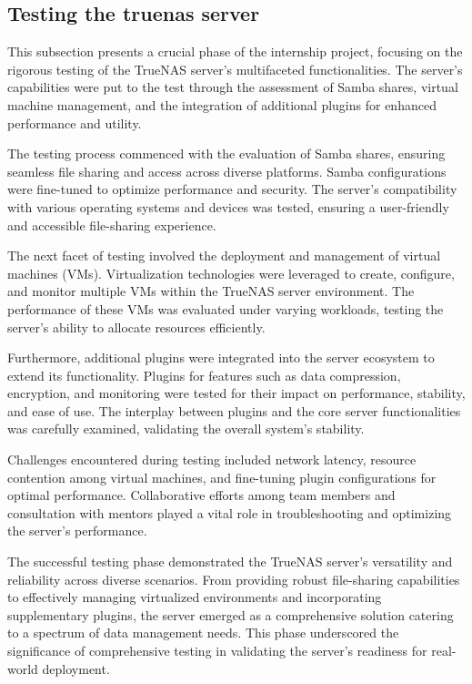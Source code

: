\subsection{Testing the truenas server}
This subsection presents a crucial phase of the internship project, focusing on the rigorous testing of the TrueNAS server's multifaceted functionalities. The server's capabilities were put to the test through the assessment of Samba shares, virtual machine management, and the integration of additional plugins for enhanced performance and utility.

The testing process commenced with the evaluation of Samba shares, ensuring seamless file sharing and access across diverse platforms. Samba configurations were fine-tuned to optimize performance and security. The server's compatibility with various operating systems and devices was tested, ensuring a user-friendly and accessible file-sharing experience.

The next facet of testing involved the deployment and management of virtual machines (VMs). Virtualization technologies were leveraged to create, configure, and monitor multiple VMs within the TrueNAS server environment. The performance of these VMs was evaluated under varying workloads, testing the server's ability to allocate resources efficiently.

Furthermore, additional plugins were integrated into the server ecosystem to extend its functionality. Plugins for features such as data compression, encryption, and monitoring were tested for their impact on performance, stability, and ease of use. The interplay between plugins and the core server functionalities was carefully examined, validating the overall system's stability.

Challenges encountered during testing included network latency, resource contention among virtual machines, and fine-tuning plugin configurations for optimal performance. Collaborative efforts among team members and consultation with mentors played a vital role in troubleshooting and optimizing the server's performance.

The successful testing phase demonstrated the TrueNAS server's versatility and reliability across diverse scenarios. From providing robust file-sharing capabilities to effectively managing virtualized environments and incorporating supplementary plugins, the server emerged as a comprehensive solution catering to a spectrum of data management needs. This phase underscored the significance of comprehensive testing in validating the server's readiness for real-world deployment.
